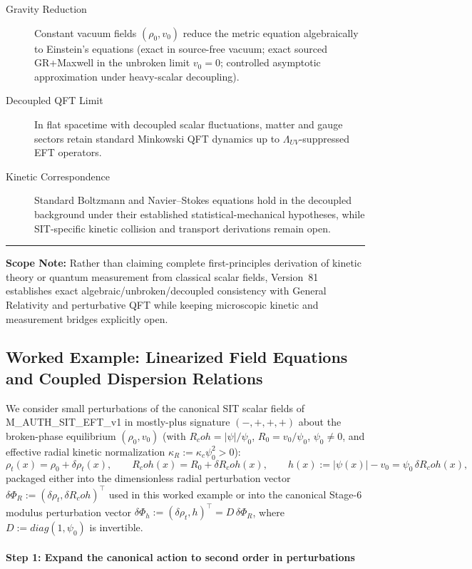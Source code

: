 \documentclass[american,11pt,letterpaper]{article}
\newcommand{\Rcoh}{R_{\mathrm{coh}}}
\def\mathrm#1{#1}%
\def\texttt#1{#1}%
\def\Rcoh{R_coh}%
\begin{document}
\begin{description}
    \item[Gravity Reduction] Constant vacuum fields $(\rho_0, v_0)$ reduce the metric equation algebraically to Einstein's equations (exact in source-free vacuum; exact sourced GR+Maxwell in the unbroken limit $v_0 = 0$; controlled asymptotic approximation under heavy-scalar decoupling).
    \item[Decoupled QFT Limit] In flat spacetime with decoupled scalar fluctuations, matter and gauge sectors retain standard Minkowski QFT dynamics up to $\Lambda_{\mathrm{UV}}$-suppressed EFT operators.
    \item[Kinetic Correspondence] Standard Boltzmann and Navier--Stokes equations hold in the decoupled background under their established statistical-mechanical hypotheses, while SIT-specific kinetic collision and transport derivations remain open.
\end{description}

\medskip\hrule\medskip
\noindent\textbf{Scope Note:} Rather than claiming complete first-principles derivation of kinetic theory or quantum measurement from classical scalar fields, Version~81 establishes exact algebraic/unbroken/decoupled consistency with General Relativity and perturbative QFT while keeping microscopic kinetic and measurement bridges explicitly open.

\subsection{Worked Example: Linearized Field Equations and Coupled Dispersion Relations}

We consider small perturbations of the canonical SIT scalar fields of \texttt{M\_AUTH\_SIT\_EFT\_v1} in mostly-plus signature $(-,+,+,+)$ about the broken-phase equilibrium $(\rho_0, v_0)$ (with $\Rcoh = |\psi|/\psi_0$, $R_0 = v_0/\psi_0$, $\psi_0 \ne 0$, and effective radial kinetic normalization $\kappa_R := \kappa_c\psi_0^2 > 0$):
\[
\rho_t(x) = \rho_0 + \delta \rho_t(x), \qquad \Rcoh(x) = R_0 + \delta \Rcoh(x), \qquad h(x) := |\psi(x)| - v_0 = \psi_0\,\delta\Rcoh(x),
\]
packaged either into the dimensionless radial perturbation vector $\delta\Phi_R := (\delta\rho_t, \delta\Rcoh)^\top$ used in this worked example or into the canonical Stage-6 modulus perturbation vector $\delta\Phi_h := (\delta\rho_t, h)^\top = D\,\delta\Phi_R$, where $D := \mathrm{diag}(1, \psi_0)$ is invertible.

\paragraph{Step 1: Expand the canonical action to second order in perturbations}
\end{document}
